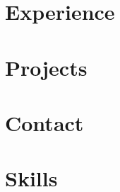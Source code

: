 


\begin{paracol}{2}
  \begin{leftcolumn}
    \section*{Experience}
    

    \section*{Projects}
    
  \end{leftcolumn}

  \begin{rightcolumn}
    \section*{Contact}
    

    \section*{Skills}

  \end{rightcolumn}

\end{paracol}


